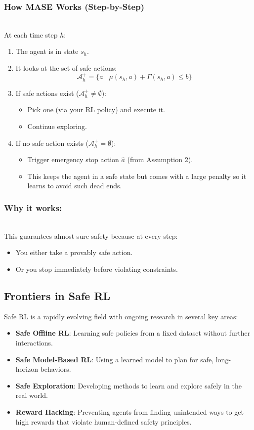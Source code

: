 \documentclass[12pt]{article}
\begin{document}
\subsubsection*{How MASE Works (Step-by-Step)}  \\ 
At each time step $h$:
\begin{enumerate}
    \item The agent is in state $s_h$.
    \item It looks at the set of safe actions:
    \[ \mathcal{A}^+_h = \{ a \mid \mu(s_h, a) + \Gamma(s_h, a) \le b \} \]
    \item If safe actions exist ($\mathcal{A}^+_h \neq \emptyset$):
    \begin{itemize}
        \item Pick one (via your RL policy) and execute it.
        \item Continue exploring.
    \end{itemize}
    \item If no safe action exists ($\mathcal{A}^+_h = \emptyset$):
    \begin{itemize}
        \item Trigger emergency stop action $\hat{a}$ (from Assumption 2).
        \item This keeps the agent in a safe state but comes with a large penalty so it learns to avoid such dead ends.
    \end{itemize}
\end{enumerate}

\subsubsection*{Why it works:}  \\ 
This guarantees almost sure safety because at every step:
\begin{itemize}
    \item You either take a provably safe action.
    \item Or you stop immediately before violating constraints.
\end{itemize}

\subsection{Frontiers in Safe RL}
Safe RL is a rapidly evolving field with ongoing research in several key areas:
\begin{itemize}
    \item \textbf{Safe Offline RL}: Learning safe policies from a fixed dataset without further interactions.
    \item \textbf{Safe Model-Based RL}: Using a learned model to plan for safe, long-horizon behaviors.
    \item \textbf{Safe Exploration}: Developing methods to learn and explore safely in the real world.
    \item \textbf{Reward Hacking}: Preventing agents from finding unintended ways to get high rewards that violate human-defined safety principles.
\end{itemize}
\end{document}
